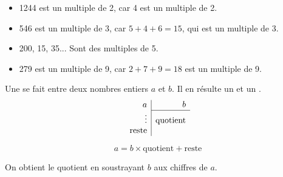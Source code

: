 \documentclass[a4paper]{article}
\begin{document}
\begin{exemple}
	\begin{itemize}
		\setlength\itemsep{0.3em}
		\item 1244 est un multiple de 2, car 4 est un multiple de 2.
		\item 546 est un multiple de 3, car $5 + 4 + 6 = 15$, qui est un multiple de 3.
		\item 200, 15, 35... Sont des multiples de 5.
		\item 279 est un multiple de 9, car $2 + 7 + 9 = 18$ est un multiple de 9.
	\end{itemize}
\end{exemple}

\begin{cours}
	Une  se fait entre deux nombres entiers $a$ et $b$. Il en résulte un  et un .
	$$
		\begin{array}{r|r}
			a            & b               \\
			\cline{2-2}
			\vdots       & \text{quotient} \\
			\text{reste} &
		\end{array}
	$$

	$$ a = b × \text{quotient} + \text{reste} $$

	On obtient le quotient en soustrayant $b$ aux chiffres de $a$.
\end{cours}
\end{document}

